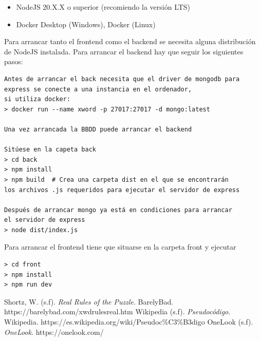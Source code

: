 \documentclass[12pt, a4paper]{article}
\begin{document}
\begin{itemize}
	\item NodeJS 20.X.X o superior (recomiendo la versión LTS)
	\item Docker Desktop (Windows), Docker (Linux)
\end{itemize}

Para arrancar tanto el frontend como el backend se necesita alguna distribución
de NodeJS instalada. Para arrancar el backend hay que seguir los siguientes pasos:

\begin{verbatim}
Antes de arrancar el back necesita que el driver de mongodb para
express se conecte a una instancia en el ordenador,
si utiliza docker:
> docker run --name xword -p 27017:27017 -d mongo:latest

Una vez arrancada la BBDD puede arrancar el backend
	
Sitúese en la capeta back
> cd back
> npm install
> npm build  # Crea una carpeta dist en el que se encontrarán
los archivos .js requeridos para ejecutar el servidor de express

Después de arrancar mongo ya está en condiciones para arrancar
el servidor de express
> node dist/index.js
\end{verbatim}

Para arrancar el frontend tiene que situarse en la carpeta front y ejecutar

\begin{verbatim}
> cd front
> npm install
> npm run dev
\end{verbatim}

\begin{thebibliography}{100}
	 Shortz, W. (s.f). \textit{Real Rules of the Puzzle}.
	BarelyBad. https://barelybad.com/xwdrulesreal.htm
	 Wikipedia (s.f). \textit{Pseudocódigo}. Wikipedia. https://es.wikipedia.org/wiki/Pseudoc\%C3\%B3digo
	 OneLook (s.f). \textit{OneLook}. https://onelook.com/

\end{thebibliography}
\end{document}
